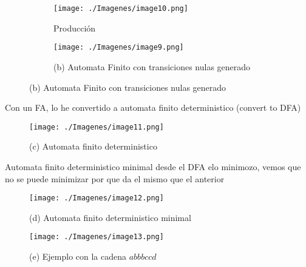 \documentclass{article}
\begin{document}
            \begin{figure}[!h] 
            \centering
                \centering
                \begin{subfigure}[b]{0.55\textwidth}
                    \centering
                    \texttt{[image: ./Imagenes/image10.png]}
                    \caption{Producción}
                    \label{fig:label1}
                \end{subfigure}
                \hfill
                \begin{subfigure}[b]{1.05\textwidth}
                    \centering
                    \texttt{[image: ./Imagenes/image9.png]}
                    \caption*{ (b) Automata Finito con transiciones nulas generado}
                    \label{fig:label2}
                \end{subfigure}
                \vspace{0.5cm} 
            \end{figure}
        
        Con un FA, lo he convertido a automata finito deterministico (convert to DFA)
        \begin{figure}[!h]
            \centering
            \texttt{[image: ./Imagenes/image11.png]}
            \caption*{(c) Automata finito deterministico}
            \label{fig:label4}
        \end{figure}

        Automata finito deterministico minimal
        desde el DFA elo minimozo, vemos que no se puede minimizar por que da el mismo que el anterior
        \begin{figure}[!h]
            \centering
            \texttt{[image: ./Imagenes/image12.png]}
            \caption*{(d) Automata finito deterministico minimal}
            \label{fig:label4}
        \end{figure}

        \newpage 
        \begin{figure}[!h]
            \centering
            \texttt{[image: ./Imagenes/image13.png]}
            \caption*{(e) Ejemplo con la cadena $abbbccd$}
            \label{fig:label4}
        \end{figure}



            

        \newpage

\end{document}
